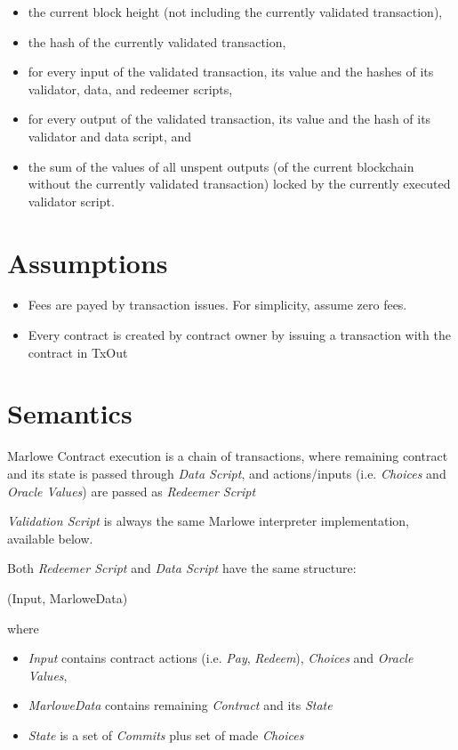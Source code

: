 \documentclass[11pt,a4paper]{article}
\begin{document}
\begin{itemize}
\item the current block height (not including the currently validated transaction),
\item the hash of the currently validated transaction,
\item for every input of the validated transaction, its value and the hashes of its validator, data, and redeemer scripts,
\item for every output of the validated transaction, its value and the hash of its validator and data script, and
\item the sum of the values of all unspent outputs (of the current blockchain without the currently validated transaction) locked by the currently executed validator script.
\end{itemize}




\section{Assumptions}

\begin{itemize}
\item Fees are payed by transaction issues. For simplicity, assume zero fees.
\item Every contract is created by contract owner by issuing a transaction with the contract in TxOut
\end{itemize}



\section{Semantics}

Marlowe Contract execution is a chain of transactions,
where remaining contract and its state is passed through \emph{Data Script},
and actions/inputs (i.e. \emph{Choices} and \emph{Oracle Values}) are passed as
\emph{Redeemer Script}

\emph{Validation Script} is always the same Marlowe interpreter implementation, available below.

Both \emph{Redeemer Script} and \emph{Data Script} have the same structure:
\begin{spec} (Input, MarloweData) \end{spec}

where
\begin{itemize}
\item \emph{Input} contains contract actions (i.e. \emph{Pay}, \emph{Redeem}), \emph{Choices} and \emph{Oracle Values},
\item \emph{MarloweData} contains remaining \emph{Contract} and its \emph{State}
\item \emph{State} is a set of \emph{Commits} plus set of made \emph{Choices}
\end{itemize}
\end{document}
